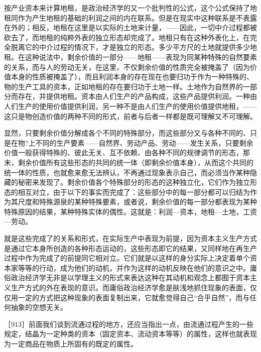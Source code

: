按产业资本来计算地租，是政治经济学的又一个批判性的公式，这个公式保持了地租同作为产生地租的基础的利润之间的内在联系。但是在现实中这种联系是不表露在外的；相反，地租在这里是以实际的土地来计量，——因此，一切中介过程都被砍去了，而地租的纯粹外表的独立形态却完成了。地租只有在这种外表化上，在完全脱离它的中介过程的情况下，才是独立的形态。多少平方尺的土地就提供多少地租。在这种说法中，剩余价值的一部分——地租——表现为同某种特殊的自然要素的关系，而与人的劳动无关，在这里，不仅剩余价值的性质完全被掩盖了（因为价值本身的性质被掩盖了），而且利润本身的存在现在也要归功于作为一种特殊的、物的生产工具的资本，正如地租的存在要归功于土地一样。土地作为自然界的一部分而存在，并提供地租。资本由人们生产的产品构成，这些产品提供利润。一种由人们生产的使用价值提供利润，另一种不是由人们生产的使用价值提供地租，——这只是物创造价值的两种不同的形式，前者与后者一样都是既可理解又不可理解。

显然，只要剩余价值分解成各个不同的特殊部分，而这些部分又与各种不同的、只是在物?上不同的生产要素——自然界、劳动产品、劳动——发生关系，只要剩余价值一般获得特殊的、彼此无关、互不依赖、由各种不同的规律调节的形态，那末，剩余价值所有这些形态的共同的统一体（即剩余价值本身），从而这个共同的统一体的性质，也就愈来愈无法辨认，不再通过现象表示自己，而必须当作某种隐藏的秘密来发现了。剩余价值各个特殊部分的形态的这种独立化，它们作为独立形态的相互对立，由于以下的事实而完成了：这些部分中的每一部分都可以归结为作为其尺度和特殊源泉的某种特殊要素，或者说，剩余价值的每一部分都表现为某种特殊原因的结果，某种特殊实体的偶性。这就是：利润—资本，地租—土地，工资—劳动。

就是这些完成了的关系和形式，在实际生产中表现为前提，因为资本主义生产方式是通过它本身所创造的各种形态运动的，这些形态即它的结果，又同样地在再生产过程中作为完成了的前提同它相对立。它们就是以这样的身分实际上决定着单个资本家等等的行动，成为他们的动机，并作为这样的动机反映在他们的意识之中。庸俗政治经济学无非是以学理主义的形式来表达这种在其动机和观念上都囿于资本主义生产方式的外在表现的意识。而庸俗政治经济学愈是肤浅地抓住现象的表面，仅仅用一定的方式把这种现象的表面复制出来，它就愈觉得自己“合乎自然”，而与任何抽象的空想无关。

［913］前面我们谈到流通过程的地方，还应当指出一点，由流通过程产生的一些规定，结晶为一定种类的资本（固定资本、流动资本等等）的属性，这样也就表现为一定商品在物质上所固有的既定的属性。

